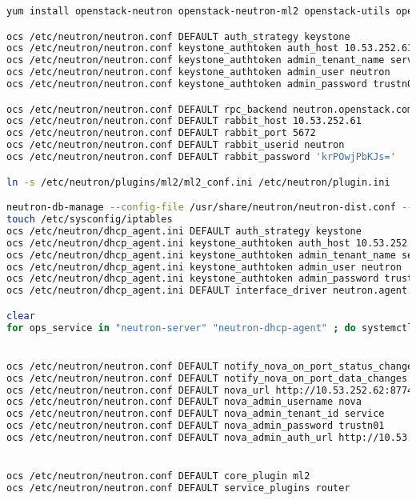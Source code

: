 \documentclass[11pt,letterpaper,oneside]{book}
\begin{document}
\begin{lstlisting}[caption={Neutron virneupaw001},language=bash]
yum install openstack-neutron openstack-neutron-ml2 openstack-utils openstack-neutron-openvswitch -y

ocs /etc/neutron/neutron.conf DEFAULT auth_strategy keystone
ocs /etc/neutron/neutron.conf keystone_authtoken auth_host 10.53.252.61
ocs /etc/neutron/neutron.conf keystone_authtoken admin_tenant_name service
ocs /etc/neutron/neutron.conf keystone_authtoken admin_user neutron
ocs /etc/neutron/neutron.conf keystone_authtoken admin_password trustn01

ocs /etc/neutron/neutron.conf DEFAULT rpc_backend neutron.openstack.common.rpc.impl_kombu
ocs /etc/neutron/neutron.conf DEFAULT rabbit_host 10.53.252.61
ocs /etc/neutron/neutron.conf DEFAULT rabbit_port 5672
ocs /etc/neutron/neutron.conf DEFAULT rabbit_userid neutron
ocs /etc/neutron/neutron.conf DEFAULT rabbit_password 'krPOwjPbKJs='

ln -s /etc/neutron/plugins/ml2/ml2_conf.ini /etc/neutron/plugin.ini

neutron-db-manage --config-file /usr/share/neutron/neutron-dist.conf --config-file /etc/neutron/neutron.conf --config-file /etc/neutron/plugin.ini upgrade head
touch /etc/sysconfig/iptables
ocs /etc/neutron/dhcp_agent.ini DEFAULT auth_strategy keystone
ocs /etc/neutron/dhcp_agent.ini keystone_authtoken auth_host 10.53.252.61
ocs /etc/neutron/dhcp_agent.ini keystone_authtoken admin_tenant_name service
ocs /etc/neutron/dhcp_agent.ini keystone_authtoken admin_user neutron
ocs /etc/neutron/dhcp_agent.ini keystone_authtoken admin_password trustn01
ocs /etc/neutron/dhcp_agent.ini DEFAULT interface_driver neutron.agent.linux.interface.OVSInterfaceDriver

clear
for ops_service in "neutron-server" "neutron-dhcp-agent" ; do systemctl enable $ops_service; systemctl start $ops_service; done


ocs /etc/neutron/neutron.conf DEFAULT notify_nova_on_port_status_changes True
ocs /etc/neutron/neutron.conf DEFAULT notify_nova_on_port_data_changes True
ocs /etc/neutron/neutron.conf DEFAULT nova_url http://10.53.252.62:8774/v2
ocs /etc/neutron/neutron.conf DEFAULT nova_admin_username nova
ocs /etc/neutron/neutron.conf DEFAULT nova_admin_tenant_id service
ocs /etc/neutron/neutron.conf DEFAULT nova_admin_password trustn01
ocs /etc/neutron/neutron.conf DEFAULT nova_admin_auth_url http://10.53.252.61:35357/v2.0


ocs /etc/neutron/neutron.conf DEFAULT core_plugin ml2
ocs /etc/neutron/neutron.conf DEFAULT service_plugins router



\end{lstlisting}
\end{document}

